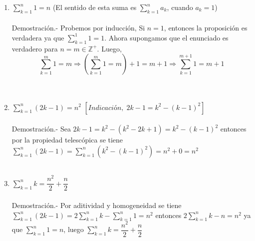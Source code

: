 \begin{enumerate}[\bfseries  1.]
\item $\displaystyle\sum_{k=1}^{n} 1 = n$ (El sentido de esta suma es $\displaystyle\sum_{k=1}^{n} a_k$, cuando $a_k=1$)\\\\
Demostración.- \; Probemos por inducción, Si $n=1$, entonces la proposición es verdadera ya que $\displaystyle\sum_{k=1}^{1} 1 = 1.$ Ahora supongamos que el enunciado es verdadero para $n=m \in \mathbb{Z}^+.$ Luego, $$\displaystyle\sum_{k=1}^m 1 = m \Rightarrow \left( \sum_{k=1}^m 1 = m \right) + 1 = m + 1 \Rightarrow \sum_{k=1}^{m+1} 1 = m+1$$\\\\

\item $\displaystyle\sum_{k=1}^{n} (2k - 1) = n^2$ $[Indicación, \; 2k-1 = k^2 - (k-1)^2]$\\\\
Demostración.- \; Sea $2k-1 = k^2 - (k^2 - 2k + 1) = k^2 - (k-1)^2$ entonces  por la propiedad telescópica se tiene $\sum\limits_{k=1}^n (2k-1)= \sum\limits_{k=1}^{n} (k^2 - (k-1)^2) = n^2 + 0 = n^2$\\\\

\item $\displaystyle\sum_{k=1}^{n} k = \dfrac{n^2}{2} + \dfrac{n}{2} $ \; \\\\
Demostración.- \;Por aditividad y homogeneidad se tiene $\sum\limits_{k=1}^{n}(2k-1) = 2\sum\limits_{k=1}^{n} k - \sum\limits_{k=1}^{n} 1 = n^2$ entonces $ 2 \sum\limits_{k=1}^{n} k - n =n^2$ ya que $\sum\limits_{k=1}^{n} 1 = n$, luego $\sum\limits_{k=1}^{n} k = \dfrac{n^2}{2} + \dfrac{n}{2}$\\\\


\end{enumerate}
